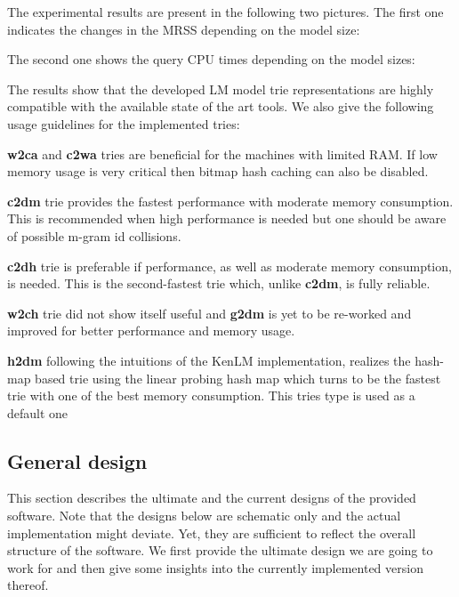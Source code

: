 The experimental results are present in the following two pictures. The first one indicates the changes in the M\+R\+S\+S depending on the model size\+:



The second one shows the query C\+P\+U times depending on the model sizes\+:



The results show that the developed L\+M model trie representations are highly compatible with the available state of the art tools. We also give the following usage guidelines for the implemented tries\+:


\begin{DoxyItemize}
\item {\bfseries w2ca} and {\bfseries c2wa} tries are beneficial for the machines with limited R\+A\+M. If low memory usage is very critical then bitmap hash caching can also be disabled.
\item {\bfseries c2dm} trie provides the fastest performance with moderate memory consumption. This is recommended when high performance is needed but one should be aware of possible m-\/gram id collisions.
\item {\bfseries c2dh} trie is preferable if performance, as well as moderate memory consumption, is needed. This is the second-\/fastest trie which, unlike {\bfseries c2dm}, is fully reliable.
\item {\bfseries w2ch} trie did not show itself useful and {\bfseries g2dm} is yet to be re-\/worked and improved for better performance and memory usage.
\item {\bfseries h2dm} following the intuitions of the Ken\+L\+M implementation, realizes the hash-\/map based trie using the linear probing hash map which turns to be the fastest trie with one of the best memory consumption. This tries type is used as a default one
\end{DoxyItemize}

\subsection*{General design}

This section describes the ultimate and the current designs of the provided software. Note that the designs below are schematic only and the actual implementation might deviate. Yet, they are sufficient to reflect the overall structure of the software. We first provide the ultimate design we are going to work for and then give some insights into the currently implemented version thereof.

